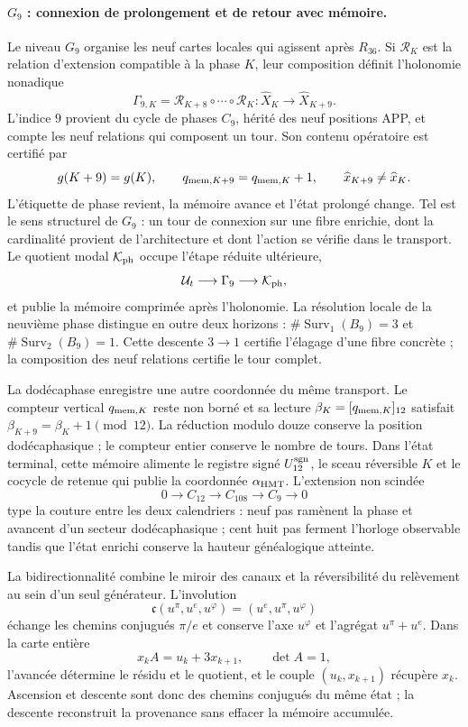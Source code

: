 \paragraph{\(G_9\) : connexion de prolongement et de retour avec mémoire.}
Le niveau \(G_9\) organise les neuf cartes locales qui agissent après
\(R_{36}\). Si \(\mathcal R_K\) est la relation d'extension compatible à
la phase \(K\), leur composition définit l'holonomie nonadique
\[
 \Gamma_{9,K}
 =\mathcal R_{K+8}\circ\cdots\circ\mathcal R_K:
 \widehat X_K\longrightarrow\widehat X_{K+9}.
\]
L'indice \(9\) provient du cycle de phases \(C_9\), hérité des neuf
positions APP, et compte les neuf relations qui composent un tour. Son
contenu opératoire est certifié par
\[
 g(K+9)=g(K),\qquad
 q_{{\rm mem},K+9}=q_{{\rm mem},K}+1,
 \qquad
 \widehat x_{K+9}\ne\widehat x_K.
\]
L'étiquette de phase revient, la mémoire avance et l'état prolongé change.
Tel est le sens structurel de \(G_9\) : un tour de connexion sur
une fibre enrichie, dont la cardinalité provient de l'architecture et dont
l'action se vérifie dans le transport. Le quotient modal \(\mathcal K_{\rm ph}\)
occupe l'étape réduite ultérieure,
\[
 \mathcal U_t\longrightarrow\Gamma_9\longrightarrow\mathcal K_{\rm ph},
\]
et publie la mémoire comprimée après l'holonomie.
La résolution locale de la neuvième phase distingue en outre deux horizons :
\(\#\operatorname{Surv}_1(B_9)=3\) et
\(\#\operatorname{Surv}_2(B_9)=1\). Cette descente \(3\to1\) certifie
l'élagage d'une fibre concrète ; la composition des neuf relations certifie
le tour complet.

La dodécaphase enregistre une autre coordonnée du même transport. Le compteur
vertical \(q_{{\rm mem},K}\) reste non borné et sa lecture
\(\beta_K=[q_{{\rm mem},K}]_{12}\) satisfait
\(\beta_{K+9}=\beta_K+1\pmod{12}\). La réduction modulo douze conserve la
position dodécaphasique ; le compteur entier conserve le nombre de tours. Dans
l'état terminal, cette mémoire alimente le registre signé
\(U_{12}^{\rm sgn}\), le sceau réversible \(K\) et le cocycle de retenue qui
publie la coordonnée \(\alpha_{\rm HMT}\).
L'extension non scindée
\[
 0\longrightarrow C_{12}\longrightarrow C_{108}
 \longrightarrow C_9\longrightarrow0
\]
type la couture entre les deux calendriers : neuf pas ramènent la phase et
avancent d'un secteur dodécaphasique ; cent huit pas ferment l'horloge observable
tandis que l'état enrichi conserve la hauteur généalogique atteinte.

La bidirectionnalité combine le miroir des canaux et la réversibilité du
relèvement au sein d'un seul générateur. L'involution
\[
 \mathfrak c(u^\pi,u^e,u^\varphi)
 =(u^e,u^\pi,u^\varphi)
\]
échange les chemins conjugués \(\pi/e\) et conserve l'axe
\(u^\varphi\) et l'agrégat \(u^\pi+u^e\). Dans la carte entière
\[
 x_kA=u_k+3x_{k+1},\qquad \det A=1,
\]
l'avancée détermine le résidu et le quotient, et le couple \((u_k,x_{k+1})\) récupère
\(x_k\). Ascension et descente sont donc des chemins conjugués du même état ;
la descente reconstruit la provenance sans effacer la mémoire accumulée.


